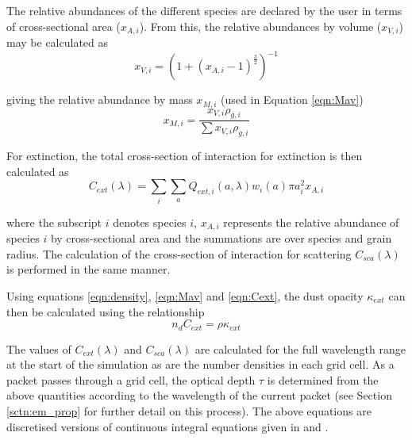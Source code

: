 The relative abundances of the different species are declared by the user in terms of cross-sectional area ($x_{A,i}$).  From this, the relative abundances by volume ($x_{V,i}$) may be calculated as
\begin{equation}
x_{V,i}=(1+(x_{A,i}-1)^{\frac{3}{2}})^{-1}
\end{equation} 

\noindent giving the relative abundance by mass $x_{M,i}$ (used in Equation \ref{eqn:Mav})  
\begin{equation}
x_{M,i}=\frac{x_{V,i}\rho_{g,i}}{\sum x_{V,i}\rho_{g,i}}
\end{equation} 


\noindent For extinction, the total cross-section of interaction for extinction is then calculated as
\begin{equation}
\label{eqn:Cext}
C_{ext}(\lambda) = \sum_{i} \sum_a Q_{ext,i}(a,\lambda) w_i(a) \pi a_i^2 x_{A,i}  
\end{equation}

\noindent where the subscript $i$ denotes species $i$, $x_{A,i}$ represents the relative abundance of species $i$ by cross-sectional area and the summations are over species and grain radius.  The calculation of the cross-section of interaction for scattering $C_{sca}(\lambda)$ is performed in the same manner.  




Using equations \ref{eqn:density}, \ref{eqn:Mav} and \ref{eqn:Cext}, the dust opacity $\kappa_{ext}$ can then be calculated using the relationship
\begin{equation}
n_dC_{ext}=\rho \kappa_{ext}
\end{equation} 

The values of $C_{ext}(\lambda)$ and $C_{sca}(\lambda)$ are calculated for the full wavelength range at the start of the simulation as are the number densities in each grid cell.  As a packet passes through a grid cell, the optical depth $\tau$ is determined from the above quantities according to the wavelength of the current packet (see Section \ref{sctn:em_prop} for further detail on this process).  The above equations are discretised versions of continuous integral equations given in \citet{hulst1957} and \citet{Tielens2005}.



